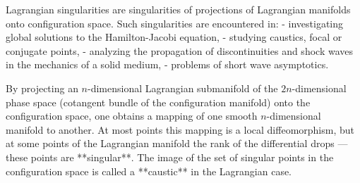 Lagrangian singularities are singularities of projections of Lagrangian manifolds onto configuration space. Such singularities are encountered in:
- investigating global solutions to the Hamilton-Jacobi equation,
- studying caustics, focal or conjugate points,
- analyzing the propagation of discontinuities and shock waves in the mechanics of a solid medium,
- problems of short wave asymptotics.

By projecting an $n$-dimensional Lagrangian submanifold of the $2n$-dimensional phase space (cotangent bundle of the configuration manifold) onto the configuration space, one obtains a mapping of one smooth $n$-dimensional manifold to another. At most points this mapping is a local diffeomorphism, but at some points of the Lagrangian manifold the rank of the differential drops — these points are **singular**. The image of the set of singular points in the configuration space is called a **caustic** in the Lagrangian case.
